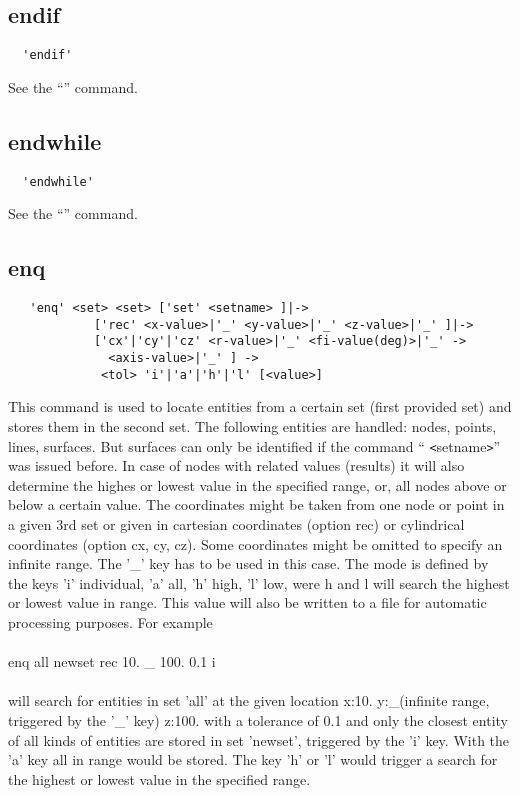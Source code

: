 \documentclass{article}
\begin{document}
\subsection{\label{endif}endif}
\begin{verbatim}
  'endif'
\end{verbatim}
See the ``'' command.

\subsection{\label{endwhile}endwhile}
\begin{verbatim}
  'endwhile'
\end{verbatim}
See the ``'' command.

\subsection{\label{enq}enq}
\begin{verbatim}
   'enq' <set> <set> ['set' <setname> ]|->
            ['rec' <x-value>|'_' <y-value>|'_' <z-value>|'_' ]|->
            ['cx'|'cy'|'cz' <r-value>|'_' <fi-value(deg)>|'_' ->
              <axis-value>|'_' ] -> 
             <tol> 'i'|'a'|'h'|'l' [<value>]
\end{verbatim}
This command is used to locate entities from a certain set (first provided set) and stores them in the second set. The following entities are handled: nodes, points, lines, surfaces. But surfaces can only be identified if the command `` \verb_<_setname\verb_>_'' was issued before. In case of nodes with related values (results) it will also determine the highes or lowest value in the specified range, or, all nodes above or below a certain value. The coordinates might be taken from one node or point in a given 3rd set or given in cartesian coordinates (option rec) or cylindrical coordinates (option cx, cy, cz). Some coordinates might be omitted to specify an infinite range. The '\_' key has to be used in this case. The mode is defined by the keys 'i' individual, 'a' all, 'h' high, 'l' low, were h and l will search the highest or lowest value in range. This value will also be written to a file for automatic processing purposes. For example\\\\
enq all newset rec 10. \_ 100. 0.1 i\\\\
will search for entities in set 'all' at the given location x:10. y:\_(infinite range, triggered by the '\_' key) z:100. with a tolerance of 0.1 and only the closest entity of all kinds of entities are stored in set 'newset', triggered by the 'i' key. With the 'a' key all in range would be stored. The key 'h' or 'l' would trigger a search for the highest or lowest value in the specified range. 
\end{document}
